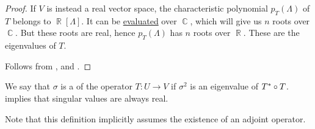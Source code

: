 \begin{proof}
   If \( V \) is instead a real vector space, the characteristic polynomial \( p_T(\Lambda) \) of \( T \) belongs to \( \BbbR[\Lambda] \). It can be \hyperref[thm:polynomial_algebra_universal_property]{evaluated} over \( \BbbC \), which will give us \( n \) roots over \( \BbbC \). But these roots are real, hence \( p_T(\Lambda) \) has \( n \) roots over \( \BbbR \). These are the eigenvalues of \( T \).

   Follows from ,  and .
\end{proof}

\begin{definition}\label{def:singular_value}
  We say that \( \sigma \) is a  of the operator \( T: U \to V \) if \( \sigma^2 \) is an eigenvalue of \( T^* \bincirc T \).  implies that singular values are always real.

  Note that this definition implicitly assumes the existence of an adjoint operator.
\end{definition}

